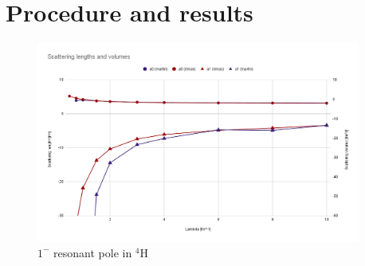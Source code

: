 \documentclass[aps,onecolumn,preprintnumbers,amsmath,amssymb,nofootinbib,superscriptaddress,notitlepage]{revtex4-1}
\begin{document}
%
%
%
%
%
%
%
%
%
%


\section{Procedure and results}

\begin{figure}
\centering
\includegraphics[width=0.95\textwidth]{./Graphs/a0a1} 
\caption{$1^-$ resonant pole in $^4$H}
\label{fig:a0a1}
\end{figure}
\end{document}
